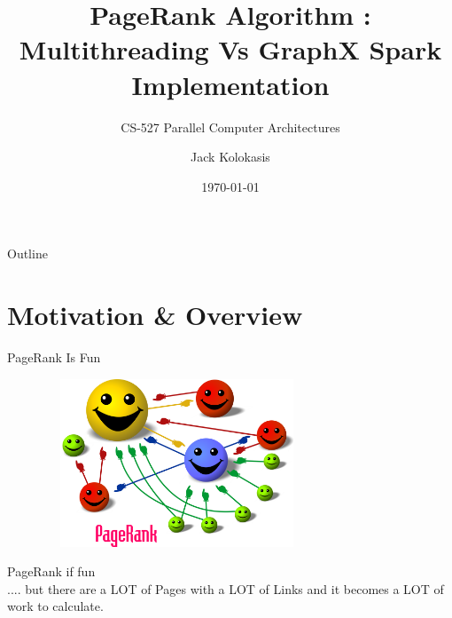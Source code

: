 \documentclass{beamer}
\title{PageRank Algorithm : Multithreading Vs GraphX Spark Implementation}
\subtitle{CS-527 Parallel Computer Architectures}
\author{Jack Kolokasis}
\institute[kolokasis@csd.forth.gr] %
\date{\today}
\begin{document}
\begin{frame}
  \titlepage
\end{frame}

\begin{frame}{Outline}
  \tableofcontents
\end{frame}

\section{Motivation \& Overview}

\begin{frame}{PageRank Is Fun}
    \begin{figure}
        \includegraphics[width=8cm, height=5cm]{figure1.png}
    \end{figure}

    \begin{itemize}
            PageRank if fun \\
            .... but there are a LOT of Pages with a LOT of Links
            and it becomes a LOT of work to calculate.
    \end{itemize}

\end{frame}
\end{document}
